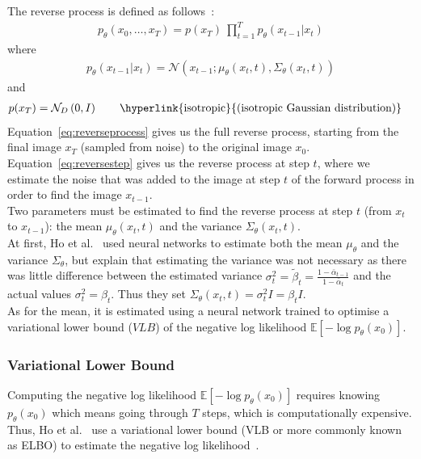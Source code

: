 \documentclass{article}
\numberwithin{equation}{section}
\numberwithin{figure}{section}
\begin{document}
The reverse process is defined as follows~\cite{ho2020denoising}:
\begin{align}
  p_{\theta}\left(x_0, \dots, x_T\right) = p\left(x_T\right) \: \prod_{t=1}^T p_{\theta}\left(x_{t-1} | x_t\right) \label{eq:reverseprocess}
\end{align}
where
\begin{align}
  p_{\theta}\left(x_{t-1} | x_t\right) = \mathcal{N}\left(x_{t-1}; \mu_{\theta}\left(x_t, t\right), \Sigma_{\theta}\left(x_t, t\right)\right) \label{eq:reversestep}
\end{align}
and
\begin{align}
  p(x_T) &= \mathcal{N}_D\left(0, I\right) \qquad \text{\hyperlink{isotropic}{(isotropic Gaussian distribution)}} \notag
\end{align}
Equation~\ref{eq:reverseprocess} gives us the full reverse process, starting from the final image $x_T$ (sampled from noise) to the original image $x_0$. \\
Equation~\ref{eq:reversestep} gives us the reverse process at step $t$, where we estimate the noise that was added to the image at step $t$ of the forward process in order to find the image $x_{t-1}$. \\
Two parameters must be estimated to find the reverse process at step $t$ (from $x_t$ to $x_{t-1}$): the mean $\mu_{\theta}\left(x_t, t\right)$ and the variance $\Sigma_{\theta}\left(x_t, t\right)$. \\
At first, Ho et al.~\cite{ho2020denoising} used neural networks to estimate both the mean $\mu_\theta$ and the variance $\Sigma_\theta$, but explain that estimating the variance was not necessary as there was little difference between the estimated variance $\sigma_t^2 = \tilde{\beta}_t = \frac{1 - \bar{\alpha}_{t-1}}{1 - \bar{\alpha}_t}$ and the actual values $\sigma_t^2 = \beta_t$. Thus they set $\Sigma_{\theta}\left(x_t, t\right) = \sigma_t^2 I = \beta_t I$. \\
As for the mean, it is estimated using a neural network trained to optimise a variational lower bound ($VLB$) of the negative log likelihood $\mathbb{E}\left[- \log p_{\theta} \left(x_0\right)\right]$.

\subsubsection{Variational Lower Bound}
Computing the negative log likelihood $\mathbb{E}\left[- \log p_{\theta} \left(x_0\right)\right]$ requires knowing $p_{\theta} (x_0)$ which means going through $T$ steps, which is computationally expensive. \\
Thus, Ho et al.~\cite{ho2020denoising} use a variational lower bound (VLB or more commonly known as ELBO) to estimate the negative log likelihood~\cite{sohldickstein2015deep}.
\end{document}
